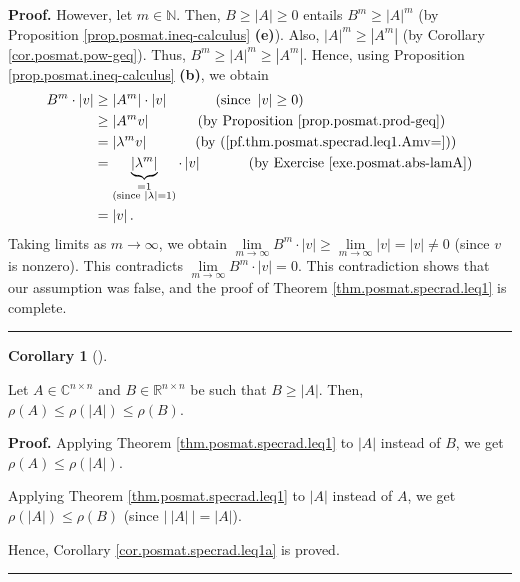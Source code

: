 \documentclass[numbers=enddot,12pt,final,onecolumn,notitlepage]{scrartcl}%
\numberwithin{exer}{subsection}
\theoremstyle{definition}
\newtheorem{coro}[theo]{Corollary}
\newenvironment{corollary}[1][]
{\begin{coro}[#1]\begin{leftbar}}
{\end{leftbar}\end{coro}}
\newenvironment{proof}[1][Proof]{\noindent\textbf{#1.} }{\ \rule{0.5em}{0.5em}}
\begin{document}
\begin{proof}
However, let $m\in\mathbb{N}$. Then, $B\geq\left\vert A\right\vert \geq0$
entails $B^{m}\geq\left\vert A\right\vert ^{m}$ (by Proposition
\ref{prop.posmat.ineq-calculus} \textbf{(e)}). Also, $\left\vert A\right\vert
^{m}\geq\left\vert A^{m}\right\vert $ (by Corollary \ref{cor.posmat.pow-geq}).
Thus, $B^{m}\geq\left\vert A\right\vert ^{m}\geq\left\vert A^{m}\right\vert $.
Hence, using Proposition \ref{prop.posmat.ineq-calculus} \textbf{(b)}, we
obtain%
\begin{align*}
B^{m}\cdot\left\vert v\right\vert  &  \geq\left\vert A^{m}\right\vert
\cdot\left\vert v\right\vert \ \ \ \ \ \ \ \ \ \ \left(  \text{since
}\left\vert v\right\vert \geq0\right)  \\
&  \geq\left\vert A^{m}v\right\vert \ \ \ \ \ \ \ \ \ \ \left(  \text{by
Proposition \ref{prop.posmat.prod-geq}}\right)  \\
&  =\left\vert \lambda^{m}v\right\vert \ \ \ \ \ \ \ \ \ \ \left(  \text{by
(\ref{pf.thm.posmat.specrad.leq1.Amv=})}\right)  \\
&  =\underbrace{\left\vert \lambda^{m}\right\vert }%
_{\substack{=1\\\text{(since }\left\vert \lambda\right\vert =1\text{)}}%
}\cdot\left\vert v\right\vert \ \ \ \ \ \ \ \ \ \ \left(  \text{by Exercise
\ref{exe.posmat.abs-lamA}}\right)  \\
&  =\left\vert v\right\vert .
\end{align*}
Taking limits as $m\rightarrow\infty$, we obtain $\lim\limits_{m\rightarrow
\infty}B^{m}\cdot\left\vert v\right\vert \geq\lim\limits_{m\rightarrow\infty
}\left\vert v\right\vert =\left\vert v\right\vert \neq0$ (since $v$ is
nonzero). This contradicts $\lim\limits_{m\rightarrow\infty}B^{m}%
\cdot\left\vert v\right\vert =0$. This contradiction shows that our assumption
was false, and the proof of Theorem \ref{thm.posmat.specrad.leq1} is complete.
\end{proof}

\begin{corollary}
\label{cor.posmat.specrad.leq1a}Let $A\in\mathbb{C}^{n\times n}$ and
$B\in\mathbb{R}^{n\times n}$ be such that $B\geq\left\vert A\right\vert $.
Then, $\rho\left(  A\right)  \leq\rho\left(  \left\vert A\right\vert \right)
\leq\rho\left(  B\right)  $.
\end{corollary}

\begin{proof}
Applying Theorem \ref{thm.posmat.specrad.leq1} to $\left\vert A\right\vert $
instead of $B$, we get $\rho\left(  A\right)  \leq\rho\left(  \left\vert
A\right\vert \right)  $.

Applying Theorem \ref{thm.posmat.specrad.leq1} to $\left\vert A\right\vert $
instead of $A$, we get $\rho\left(  \left\vert A\right\vert \right)  \leq
\rho\left(  B\right)  $ (since $\left\vert \ \left\vert A\right\vert
\ \right\vert =\left\vert A\right\vert $).

Hence, Corollary \ref{cor.posmat.specrad.leq1a} is proved.
\end{proof}
\end{document}
